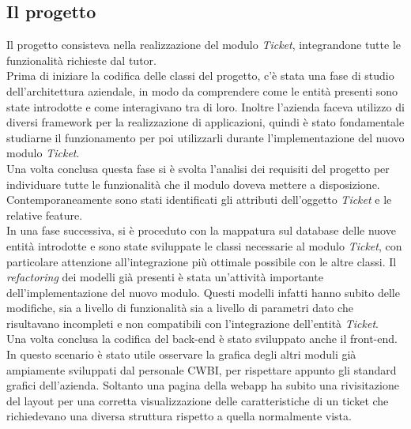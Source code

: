\subsection{Il progetto}
Il progetto consisteva nella realizzazione del modulo \textit{Ticket}, integrandone tutte le funzionalità richieste dal tutor. \\
Prima di iniziare la codifica delle classi del progetto, c'è stata una fase di studio dell'architettura aziendale, in modo da comprendere come le entità presenti sono state introdotte e come interagivano tra di loro. Inoltre l'azienda faceva utilizzo di diversi framework per la realizzazione di applicazioni, quindi è stato fondamentale studiarne il funzionamento per poi utilizzarli durante l'implementazione del nuovo modulo \textit{Ticket}.\\
Una volta conclusa questa fase si è svolta l'analisi dei requisiti del progetto per individuare tutte le funzionalità che il modulo doveva mettere a disposizione. Contemporaneamente sono stati identificati gli attributi dell'oggetto \textit{Ticket} e le relative feature. \\
In una fase successiva, si è proceduto con la mappatura sul database delle nuove entità introdotte e sono state sviluppate le classi necessarie al modulo \textit{Ticket}, con particolare attenzione all'integrazione più ottimale possibile con le altre classi. Il \textit{refactoring} dei modelli già presenti è stata un'attività importante dell'implementazione del nuovo modulo. Questi modelli infatti hanno subito delle modifiche, sia a livello di funzionalità sia a livello di parametri dato che risultavano incompleti e non compatibili con l'integrazione  dell'entità \textit{Ticket}.\\
Una volta conclusa la codifica del back-end è stato sviluppato anche il front-end. In questo scenario è stato utile osservare la grafica degli altri moduli già ampiamente sviluppati dal personale CWBI, per rispettare appunto gli standard grafici dell'azienda. Soltanto una pagina della webapp ha subito una rivisitazione del layout per una corretta visualizzazione delle caratteristiche di un ticket che richiedevano una diversa struttura rispetto a quella normalmente vista.


